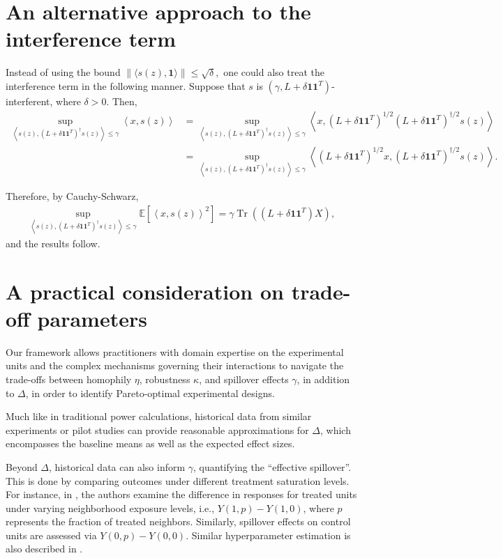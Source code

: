 \documentclass[12pt]{article}
\theoremstyle{definition}
\numberwithin{equation}{section}
\numberwithin{figure}{section}
\newcommand\dotp[1]{\left\langle #1 \right\rangle}
\numberwithin{equation}{section}
\numberwithin{figure}{section}
\begin{document}
\section{An alternative approach to the interference term} \label{alternative_interference}
Instead of using the bound $\| \langle s(z) , \mathbf{1} \rangle \| \leq \sqrt{\delta},$ one could also treat the interference term in the following manner. Suppose that $s$ is $(\gamma, L + \delta \mathbf{1}\mathbf{1}^T)$-interferent, where $\delta > 0$. Then,
\begin{align*}
   \sup_{\dotp{s(z), (L + \delta \mathbf{1}\mathbf{1}^T )^\dagger s(z)} \leq \gamma} \dotp{x, s(z)} &= \sup_{\dotp{s(z), (L + \delta \mathbf{1}\mathbf{1}^T )^\dagger s(z)} \leq \gamma} \dotp{x,(L + \delta \mathbf{1}\mathbf{1}^T)^{1/2} (L+ \delta \mathbf{1}\mathbf{1}^T)^{\dagger/2} s(z)} \\
   &=  \sup_{\dotp{s(z), (L + \delta \mathbf{1}\mathbf{1}^T )^\dagger s(z)} \leq \gamma} \dotp{ (L+ \delta \mathbf{1}\mathbf{1}^T )^{1/2}x, (L + \delta \mathbf{1}\mathbf{1}^T)^{\dagger/2}s(z)}.
\end{align*}

Therefore, by Cauchy-Schwarz, 
\begin{align*}
   \sup_{\dotp{s(z), (L + \delta \mathbf{1}\mathbf{1}^T)^{\dagger} s(z)} \leq \gamma}  \mathbb{E}[\dotp{x, s(z)}^2] = \gamma \operatorname{Tr}((L+ \delta \mathbf{1}\mathbf{1}^T ) X),
\end{align*}
and the results follow.

\section{A practical consideration on trade-off parameters}

Our framework allows practitioners with domain expertise on the experimental units and the complex mechanisms governing their interactions to navigate the trade-offs between homophily $\eta$, robustness $\kappa$, and spillover effects $\gamma$, in addition to $\Delta$, in order to identify Pareto-optimal experimental designs.

Much like in traditional power calculations, historical data from similar experiments or pilot studies can provide reasonable approximations for $\Delta$, which encompasses the baseline means as well as the expected effect sizes.

Beyond $\Delta$, historical data can also inform $\gamma$, quantifying the ``effective spillover''. This is done by comparing outcomes under different treatment saturation levels. For instance, in \citep{baird2018optimal}, the authors examine the difference in responses for treated units under varying neighborhood exposure levels, i.e., $Y(1, p) - Y(1, 0)$, where $p$ represents the fraction of treated neighbors. Similarly, spillover effects on control units are assessed via $Y(0, p) - Y(0, 0)$. Similar hyperparameter estimation is also described in \citep{viviano2023causal}.
\end{document}
